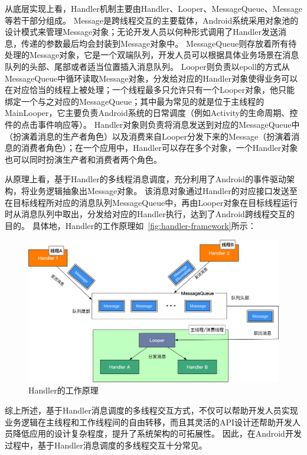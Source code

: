 从底层实现上看，Handler机制主要由Handler、Looper、MessageQueue、Message等若干部分组成。
Message是跨线程交互的主要载体，Android系统采用对象池的设计模式来管理Message对象；无论开发人员以何种形式调用了Handler发送消息，传递的参数最后均会封装到Message对象中。
MessageQueue则存放着所有待处理的Message对象，它是一个双端队列，开发人员可以根据具体业务场景在消息队列的头部、尾部或者适当位置插入消息队列。
Looper则负责以epoll的方式从MessageQueue中循环读取Message对象，分发给对应的Handler对象使得业务可以在对应恰当的线程上被处理；一个线程最多只允许只有一个Looper对象，他只能绑定一个与之对应的MessageQueue；其中最为常见的就是位于主线程的MainLooper，它主要负责Android系统的日常调度（例如Activity的生命周期、控件的点击事件响应等）。
Handler对象则负责将消息发送到对应的MessageQueue中（扮演着消息的生产者角色）以及消费来自Looper分发下来的Message（扮演着消息的消费者角色）；在一个应用中，Handler可以存在多个对象，一个Handler对象也可以同时扮演生产者和消费者两个角色。

从原理上看，基于Handler的多线程消息调度，充分利用了Android的事件驱动架构，将业务逻辑抽象出Message对象。
该消息对象通过Handler的对应接口发送至在目标线程所对应的消息队列MessageQueue中，再由Looper对象在目标线程运行时从消息队列中取出，分发给对应的Handler执行，达到了Android跨线程交互的目的。
具体地，Handler的工作原理如~\autoref{fig:handler-framework}所示：


\begin{figure}[h]
	\centering
	\includegraphics[width=\textwidth]{./Figures/Handler-framework.png}
	\caption{ Handler的工作原理}
	\label{fig:handler-framework}
\end{figure}


综上所述，基于Handler消息调度的多线程交互方式，不仅可以帮助开发人员实现业务逻辑在主线程和工作线程间的自由转移，而且其灵活的API设计还帮助开发人员降低应用的设计复杂程度，提升了系统架构的可拓展性。
因此，在Android开发过程中，基于Handler消息调度的多线程交互十分常见。
